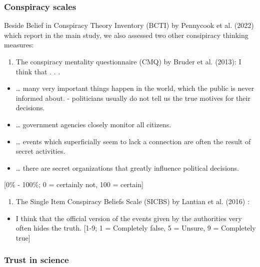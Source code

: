\documentclass[
  doc,floatsintext]{apa6}
\providecommand{\tightlist}{%
  \setlength{\itemsep}{0pt}\setlength{\parskip}{0pt}}
\begin{document}
\subsubsection{Conspiracy scales}\label{conspiracy-scales}

Beside Belief in Conspiracy Theory Inventory (BCTI) by Pennycook et al. (2022) which report in the main study, we also assessed two other consipiracy thinking measures:

\begin{enumerate}
\def\labelenumi{\arabic{enumi}.}
\tightlist
\item
  The conspiracy mentality questionnaire (CMQ) by Bruder et al. (2013):
  I think that . . .
\end{enumerate}

\begin{itemize}
\tightlist
\item
  \ldots{} many very important things happen in the world, which the public is never informed about. - politicians usually do not tell us the true motives for their decisions.
\item
  \ldots{} government agencies closely monitor all citizens.
\item
  \ldots{} events which superficially seem to lack a connection are often the result of secret activities.
\item
  \ldots{} there are secret organizations that greatly influence political decisions.
\end{itemize}

{[}0\% - 100\%; 0 = certainly not, 100 = certain{]}

\begin{enumerate}
\def\labelenumi{\arabic{enumi}.}
\setcounter{enumi}{1}
\tightlist
\item
  The Single Item Conspiracy Beliefs Scale (SICBS) by Lantian et al. (2016) :
\end{enumerate}

\begin{itemize}
\tightlist
\item
  I think that the official version of the events given by the authorities very often hides the truth. {[}1-9; 1 = Completely false, 5 = Unsure, 9 = Completely true{]}
\end{itemize}

\subsubsection{Trust in science}\label{trust-in-science-1}
\end{document}
